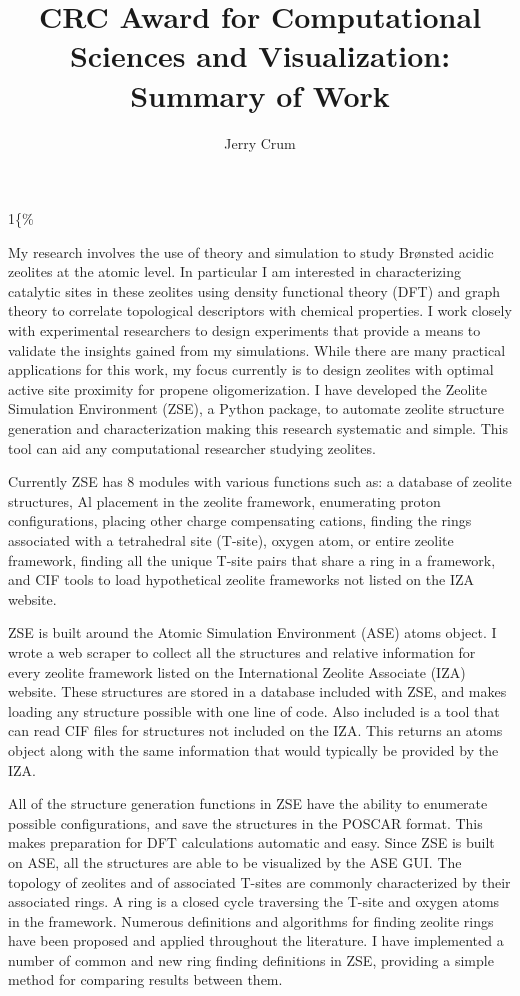 \documentclass[11pt]{article}
\author{Jerry Crum}
\date{}
\title{CRC Award for Computational Sciences and Visualization: Summary of Work}
\begin{document}
\begin{OPTIONS}
\def\udesoftecoverride\#1\mainmatter\{\%
  \AfterEndPreamble{#1\mainmatter}
\end{OPTIONS}

\maketitle
\Sectionnumbersoff

My research involves the use of theory and simulation to study Br\o nsted acidic zeolites at the atomic level. In particular I am interested in characterizing catalytic sites in these zeolites using density functional theory (DFT) and graph theory to correlate topological descriptors with chemical properties. I work closely with experimental researchers to design experiments that provide a means to validate the insights gained from my simulations. While there are many practical applications for this work, my focus currently is to design zeolites with optimal active site proximity for propene oligomerization. I have developed the Zeolite Simulation Environment (ZSE), a Python package, to automate zeolite structure generation and characterization making this research systematic and simple. This tool can aid any computational researcher studying zeolites. 

Currently ZSE has 8 modules with various functions such as: a database of zeolite structures, Al placement in the zeolite framework, enumerating proton configurations, placing other charge compensating cations, finding the rings associated with a tetrahedral site (T-site), oxygen atom, or entire zeolite framework, finding all the unique T-site pairs that share a ring in a framework, and CIF tools to load hypothetical zeolite frameworks not listed on the IZA website. 

ZSE is built around the Atomic Simulation Environment (ASE) atoms object. \cite{ase-ask} I wrote a web scraper to collect all the structures and relative information for every zeolite framework listed on the International Zeolite Associate (IZA) website. \cite{baerlocher}  These structures are stored in a database included with ZSE, and makes loading any structure possible with one line of code. Also included is a tool that can read CIF files for structures not included on the IZA. This returns an atoms object along with the same information that would typically be provided by the IZA. 

All of the structure generation functions in ZSE have the ability to enumerate possible configurations, and save the structures in the POSCAR format. This makes preparation for DFT calculations automatic and easy. Since ZSE is built on ASE, all the structures are able to be visualized by the ASE GUI. The topology of zeolites and of associated T-sites are commonly characterized by their associated rings. A ring is a closed cycle traversing the T-site and oxygen atoms in the framework. Numerous definitions and algorithms for finding zeolite rings have been proposed and applied throughout the literature. I have implemented a number of common and new ring finding definitions in ZSE, providing a simple method for comparing results between them. 
\end{document}
